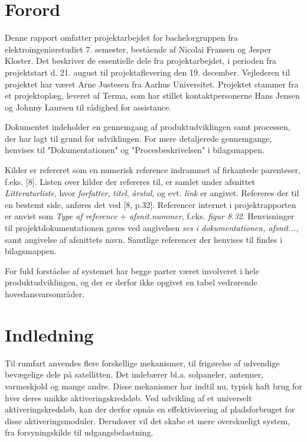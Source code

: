
\chapter*{Forord}

Denne rapport omfatter projektarbejdet for bachelorgruppen fra elektroingeniørstudiet 7. semester, bestående af Nicolai Fransen og Jesper Kloster. Det beskriver de essentielle dele fra projektarbejdet, i perioden fra projektstart d. 21. august til projektaflevering den 19. december. Vejlederen til projektet har været Arne Justesen fra Aarhus Universitet. Projektet stammer fra et projektoplæg, leveret af Terma, som har stillet kontaktpersonerne Hans Jensen og Johnny Laursen til rådighed for assistance.

Dokumentet indeholder en gennemgang af produktudviklingen samt processen, der har lagt til grund for udviklingen. For mere detaljerede gennemgange, henvises til "Dokumentationen" og "Procesbeskrivelsen" i bilagsmappen.   

Kilder er refereret som en numerisk reference indrammet af firkantede parenteser, f.eks. [8]. Listen over kilder der refereres til, er samlet under afsnittet \textit{Litteraturliste}, hvor \textit{forfatter}, \textit{titel}, \textit{årstal}, og evt. \textit{link} er angivet. Refereres der til en bestemt side, anføres det ved [8, p.32]. Referencer internet i projektrapporten er anvist som \textit{Type af reference} + \textit{afsnit.nummer}, f.eks. \textit{figur 8.32}. Henvisninger til projektdokumentationen gøres ved  angivelsen \textit{ses i dokumentationen, afsnit...}, samt angivelse af afsnittets navn. Samtlige referencer der henvises til findes i bilagsmappen. 

\noindent For fuld forståelse af systemet har begge parter været involveret i hele produktudviklingen, og der er derfor ikke opgivet en tabel vedrørende hovedansvarsområder.


{\let\clearpage\relax \chapter{Indledning}}
\noindent Til rumfart anvendes flere forskellige mekanismer, til frigørelse af udvendige bevægelige dele på satellitten. Det indebærer bl.a. solpaneler, antenner, varmeskjold og mange andre. Disse mekanismer har indtil nu, typisk haft brug for hver deres unikke aktiveringskredsløb. Ved udvikling af et universelt aktiveringskredsløb, kan der derfor opnås en effektivisering af pladsforbruget for disse aktiveringsmoduler. Derudover vil det skabe et mere overskueligt system, fra forsyningskilde til udgangsbelastning. 

